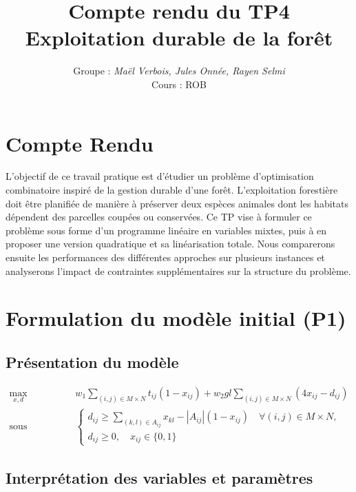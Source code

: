 \documentclass[a4paper,11pt]{article}
\title{\textbf{Compte rendu du TP4}\\[4pt]
\large Exploitation durable de la forêt}
\author{Groupe : \textit{Maël Verbois, Jules Onnée, Rayen Selmi} \\[2pt] Cours : ROB}
\begin{document}
\maketitle

\section{Compte Rendu}
L’objectif de ce travail pratique est d’étudier un problème d’optimisation combinatoire inspiré de la gestion durable d’une forêt. 
L’exploitation forestière doit être planifiée de manière à préserver deux espèces animales dont les habitats dépendent des parcelles coupées ou conservées. 
Ce TP vise à formuler ce problème sous forme d’un programme linéaire en variables mixtes, puis à en proposer une version quadratique et sa linéarisation totale. 
Nous comparerons ensuite les performances des différentes approches sur plusieurs instances et analyserons l’impact de contraintes supplémentaires sur la structure du problème.

\section{Formulation du modèle initial (P1)}
\subsection{Présentation du modèle}


\[
\begin{aligned}
\max_{x,d} \quad & w_1 \sum_{(i,j)\in M\times N} t_{ij}(1 - x_{ij}) + w_2 g l \sum_{(i,j)\in M\times N} (4x_{ij} - d_{ij}) \\
\text{sous contraintes} \quad &
\begin{cases}
d_{ij} \ge \sum_{(k,l)\in A_{ij}} x_{kl} - |A_{ij}|(1 - x_{ij}) \quad \forall (i,j)\in M\times N,\\[8pt]
d_{ij} \ge 0, \quad x_{ij}\in \{0,1\}
\end{cases}
\end{aligned}
\]

\subsection{Interprétation des variables et paramètres}
\end{document}
